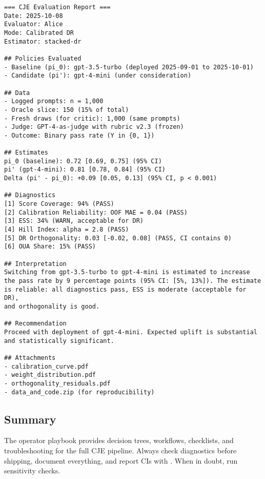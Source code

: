 \begin{lstlisting}
=== CJE Evaluation Report ===
Date: 2025-10-08
Evaluator: Alice
Mode: Calibrated DR
Estimator: stacked-dr

## Policies Evaluated
- Baseline (pi_0): gpt-3.5-turbo (deployed 2025-09-01 to 2025-10-01)
- Candidate (pi'): gpt-4-mini (under consideration)

## Data
- Logged prompts: n = 1,000
- Oracle slice: 150 (15% of total)
- Fresh draws (for critic): 1,000 (same prompts)
- Judge: GPT-4-as-judge with rubric v2.3 (frozen)
- Outcome: Binary pass rate (Y in {0, 1})

## Estimates
pi_0 (baseline): 0.72 [0.69, 0.75] (95% CI)
pi' (gpt-4-mini): 0.81 [0.78, 0.84] (95% CI)
Delta (pi' - pi_0): +0.09 [0.05, 0.13] (95% CI, p < 0.001)

## Diagnostics
[1] Score Coverage: 94% (PASS)
[2] Calibration Reliability: OOF MAE = 0.04 (PASS)
[3] ESS: 34% (WARN, acceptable for DR)
[4] Hill Index: alpha = 2.8 (PASS)
[5] DR Orthogonality: 0.03 [-0.02, 0.08] (PASS, CI contains 0)
[6] OUA Share: 15% (PASS)

## Interpretation
Switching from gpt-3.5-turbo to gpt-4-mini is estimated to increase
the pass rate by 9 percentage points (95% CI: [5%, 13%]). The estimate
is reliable: all diagnostics pass, ESS is moderate (acceptable for DR),
and orthogonality is good.

## Recommendation
Proceed with deployment of gpt-4-mini. Expected uplift is substantial
and statistically significant.

## Attachments
- calibration_curve.pdf
- weight_distribution.pdf
- orthogonality_residuals.pdf
- data_and_code.zip (for reproducibility)
\end{lstlisting}

\subsection{Summary}

The operator playbook provides decision trees, workflows, checklists, and troubleshooting for the full CJE pipeline. Always check diagnostics before shipping, document everything, and report CIs with \oua. When in doubt, run sensitivity checks.
